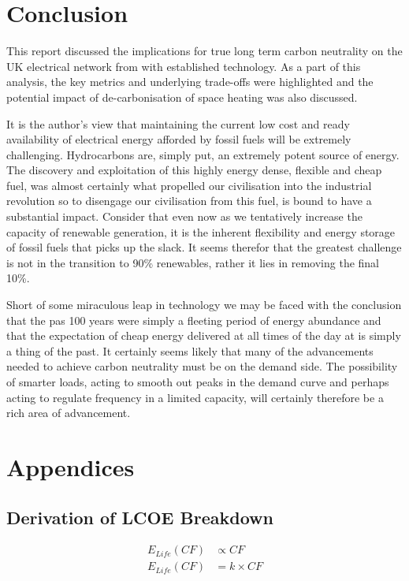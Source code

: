 \documentclass[11pt]{article}
\numberwithin{equation}{section}
\begin{document}
\section{Conclusion}
\label{sec:orgb48f413}
This report discussed the implications for true long term carbon neutrality on the UK electrical network from with established technology. As a part of this analysis, the key metrics and underlying trade-offs were highlighted and the potential impact of de-carbonisation of space heating was also discussed.

It is the author's view that maintaining the current low cost and ready availability of electrical energy afforded by fossil fuels will be extremely challenging. Hydrocarbons are, simply put, an extremely potent source of energy. The discovery and exploitation of this highly energy dense, flexible and cheap fuel, was almost certainly what propelled our civilisation into the industrial revolution so to disengage our civilisation from this fuel, is bound to have a substantial impact. Consider that even now as we tentatively increase the capacity of renewable generation, it is the inherent flexibility and energy storage of fossil fuels that picks up the slack. It seems therefor that the greatest challenge is not in the transition to 90\% renewables, rather it lies in removing the final 10\%.

Short of some miraculous leap in technology we may be faced with the conclusion that the pas 100 years were simply a fleeting period of energy abundance and that the expectation of cheap energy delivered at all times of the day at is simply a thing of the past. It certainly seems likely that many of the advancements needed to achieve carbon neutrality must be on the demand side. The possibility of smarter loads, acting to smooth out peaks in the demand curve and perhaps acting to regulate frequency in a limited capacity, will certainly therefore be a rich area of advancement.

\section{Appendices}
\label{sec:orga4b94cd}
\subsection{Derivation of LCOE Breakdown \label{secAppDerivationOfLCOEBreakdown}}
\label{sec:orgb3bc6de}
\begin{align}
\label{eqELifetime}
E_{Life}(CF) &\propto CF\\
E_{Life}(CF) &= k\times CF
\end{align}
\end{document}
